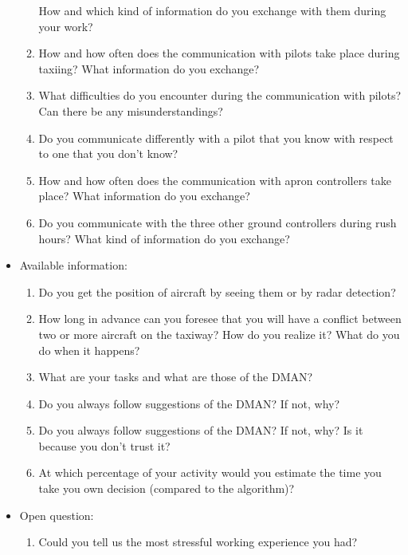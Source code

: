 \documentclass{article}
\begin{document}
\begin{itemize}
\begin{enumerate}
            How and which kind of information do you exchange with them during your work?
            \item How and how often does the communication with pilots take place during taxiing? What information do you exchange? 
            \item What difficulties do you encounter during the communication with pilots? Can there be any misunderstandings?
            \item Do you communicate differently with a pilot that you know with respect to one that you don't know?
            \item How and how often does the communication with apron controllers take place? What information do you exchange?
            \item Do you communicate with the three other ground controllers during rush hours? What kind of information do you exchange?
        \end{enumerate}
        
    \item Available information:
        \begin{enumerate}
            \item Do you get the position of aircraft by seeing them or by radar detection?
            \item How long in advance can you foresee that you will have a conflict between two or more aircraft on the taxiway? How do you realize it? What do you do when it happens?
            \item What are your tasks and what are those of the DMAN? 
            \item Do you always follow suggestions of the DMAN? If not, why?
            \item Do you always follow suggestions of the DMAN? If not, why? Is it because you don't trust it?
            \item At which percentage of your activity would you estimate the time you take you own decision (compared to the algorithm)? 
        \end{enumerate}
    \item Open question:
    \begin{enumerate}
        \item Could you tell us the most stressful working experience you had?
    \end{enumerate}
    
\end{itemize}
\end{document}
